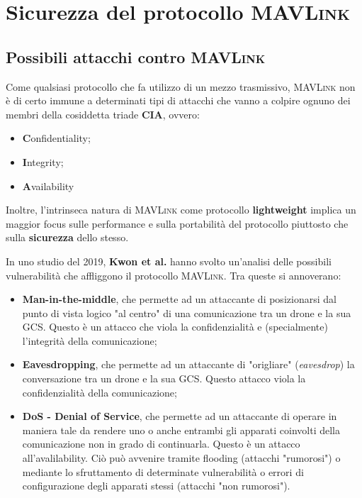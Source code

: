 \documentclass[a4paper, 12pt, oneside]{article}
\theoremstyle{definition}
\begin{document}
\newpage

\section{Sicurezza del protocollo \textsc{MAVLink}}
\subsection{Possibili attacchi contro \textsc{MAVLink}}
Come qualsiasi protocollo che fa utilizzo di un mezzo trasmissivo, \textsc{MAVLink} non è di certo immune a determinati tipi di attacchi che vanno a colpire ognuno dei membri della cosiddetta triade \textbf{CIA}, ovvero:

\begin{itemize}
    \item \textbf{C}onfidentiality;
    \item \textbf{I}ntegrity;
    \item \textbf{A}vailability
\end{itemize}

Inoltre, l'intrinseca natura di \textsc{MAVLink} come protocollo \textbf{lightweight} implica un maggior focus sulle performance e sulla portabilità del protocollo piuttosto che sulla \textbf{sicurezza} dello stesso.

In uno studio \cite{8425627} del 2019, \textbf{Kwon et al.} hanno svolto un'analisi delle possibili vulnerabilità che affliggono il protocollo \textsc{MAVLink}. Tra queste si annoverano:

\begin{itemize}
    \item \textbf{Man-in-the-middle}, che permette ad un attaccante di posizionarsi dal punto di vista logico "al centro" di una comunicazione tra un drone e la sua GCS. Questo è un attacco che viola la confidenzialità e (specialmente) l'integrità della comunicazione;
    \item \textbf{Eavesdropping}, che permette ad un attaccante di "origliare" (\textit{eavesdrop}) la conversazione tra un drone e la sua GCS. Questo attacco viola la confidenzialità della comunicazione;
    \item \textbf{DoS - Denial of Service}, che permette ad un attaccante di operare in maniera tale da rendere uno o anche entrambi gli apparati coinvolti della comunicazione non in grado di continuarla. Questo è un attacco all'avalilability. Ciò può avvenire tramite flooding (attacchi "rumorosi") o mediante lo sfruttamento di determinate vulnerabilità o errori di configurazione degli apparati stessi (attacchi "non rumorosi").
\end{itemize}
\end{document}
